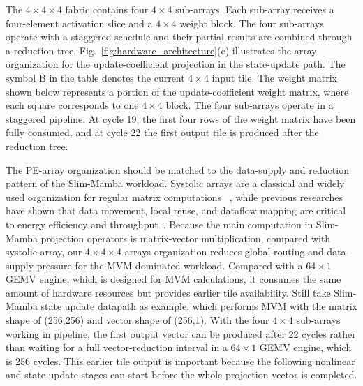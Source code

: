 \documentclass[lettersize,journal]{IEEEtran}
\begin{document}

The $4\times4\times4$ fabric contains four $4\times4$ sub-arrays. Each
sub-array receives a four-element activation slice and a $4\times4$ weight
block. The four sub-arrays operate with a staggered schedule and their partial
results are combined through a reduction tree. Fig.~\ref{fig:hardware_architecture}(c)
illustrates the array organization for the update-coefficient projection in the
state-update path. The symbol B in the table denotes the current $4\times4$
input tile. The weight matrix shown below represents a portion of the
update-coefficient weight matrix, where each square corresponds to one
$4\times4$ block. The four sub-arrays operate in a staggered pipeline. At cycle
19, the first four rows of the weight matrix have been fully consumed, and at
cycle 22 the first output tile is produced after the reduction tree.
 
The PE-array organization should be matched to the data-supply and reduction pattern of the 
Slim-Mamba workload. Systolic arrays are a classical and widely used organization for regular 
matrix computations ~\cite{Kung1982Systolic,Liu2020STA}, while previous researches 
have shown that data movement, local reuse, and dataflow mapping are critical to energy efficiency 
and throughput~\cite{Sze2017EfficientDNN,Chen2017Eyeriss}. Because the main computation in Slim-Mamba projection 
operators is matrix-vector multiplication, compared with systolic 
array, our $4\times4\times4$ arrays organization reduces global routing and
data-supply pressure for the MVM-dominated workload. Compared with a
$64\times1$ GEMV engine, which is designed for MVM calculations, it consumes the same amount of hardware resources but provides
earlier tile availability. Still take Slim-Mamba state update datapath as example, which
performs MVM with the matrix shape of (256,256) and vector shape of (256,1). With the 
four $4\times4$ sub-arrays working in pipeline, the first output vector can be produced 
after 22 cycles rather than waiting for a full
vector-reduction interval in a $64\times1$ GEMV engine, which is 256 cycles. 
This earlier tile output is important because the
following nonlinear and state-update stages can start before the whole
projection vector is completed.
\end{document}
